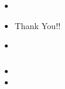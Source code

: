 \documentclass[aspectratio=169]{beamer}
\begin{document}
  \begin{frame}
    \frametitle{}
    \begin{itemize}
      \item{}
      \item{Thank You!!} 
      \item{}
    \end{itemize}
  \end{frame}
  
  \begin{frame}
    \frametitle{}
    \begin{itemize}
      \item{} 
      \item{}
    \end{itemize}
  \end{frame}
 
  
\end{document}
